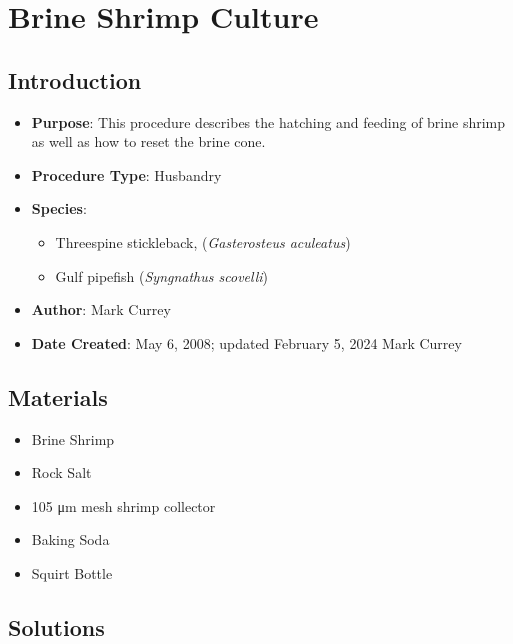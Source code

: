 \documentclass[
  letterpaper,
  DIV=11,
  numbers=noendperiod]{scrreprt}
\providecommand{\tightlist}{%
  \setlength{\itemsep}{0pt}\setlength{\parskip}{0pt}}\usepackage{longtable,booktabs,array}
\begin{document}
\hypertarget{sec-husbandry-brine_gen_hatch_feed}{%
\chapter{Brine Shrimp
Culture}\label{sec-husbandry-brine_gen_hatch_feed}}

\hypertarget{introduction-21}{%
\section{Introduction}\label{introduction-21}}

\begin{itemize}
\tightlist
\item
  \textbf{Purpose}: This procedure describes the hatching and feeding of
  brine shrimp as well as how to reset the brine cone.
\item
  \textbf{Procedure Type}: Husbandry
\item
  \textbf{Species}:

  \begin{itemize}
  \tightlist
  \item
    Threespine stickleback, (\emph{Gasterosteus aculeatus})
  \item
    Gulf pipefish (\emph{Syngnathus scovelli})
  \end{itemize}
\item
  \textbf{Author}: Mark Currey
\item
  \textbf{Date Created}: May 6, 2008; updated February 5, 2024 Mark
  Currey
\end{itemize}

\hypertarget{materials-19}{%
\section{Materials}\label{materials-19}}

\begin{itemize}
\tightlist
\item
  Brine Shrimp
\item
  Rock Salt
\item
  105 μm mesh shrimp collector
\item
  Baking Soda
\item
  Squirt Bottle
\end{itemize}

\hypertarget{solutions-16}{%
\section{Solutions}\label{solutions-16}}
\end{document}
